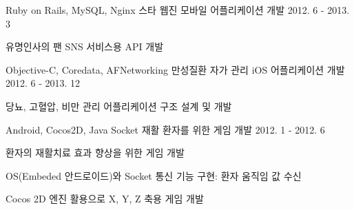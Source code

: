 \begin{cvexpentries}
  \cvexpentry
    {Ruby on Rails, MySQL, Nginx}
    {스타 웹진 모바일 어플리케이션 개발}
    {2012. 6 - 2013. 3}
    {}
    {
        \begin{cvitems}
            \item {유명인사의 팬 SNS 서비스용 API 개발}
        \end{cvitems}
    }
\end{cvexpentries}

\begin{cvexpentries}
  \cvexpentry
    {Objective-C, Coredata, AFNetworking}
    {만성질환 자가 관리 iOS 어플리케이션 개발}
    {2012. 6 - 2013. 12}
    {}
    {
        \begin{cvitems}
            \item {당뇨, 고혈압, 비만 관리 어플리케이션 구조 설계 및 개발}
        \end{cvitems}
    }
\end{cvexpentries}

\begin{cvexpentries}
  \cvexpentry
    {Android, Cocos2D, Java Socket}
    {재활 환자를 위한 게임 개발}
    {2012. 1 - 2012. 6}
    {}
    {
        \begin{cvitems}
            \item {환자의 재활치료 효과 향상을 위한 게임 개발}
            \item {OS(Embeded 안드로이드)와 Socket 통신 기능 구현: 환자 움직임 값 수신}
            \item {Cocos 2D 엔진 활용으로 X, Y, Z 축용 게임 개발}
        \end{cvitems}
    }
\end{cvexpentries}

